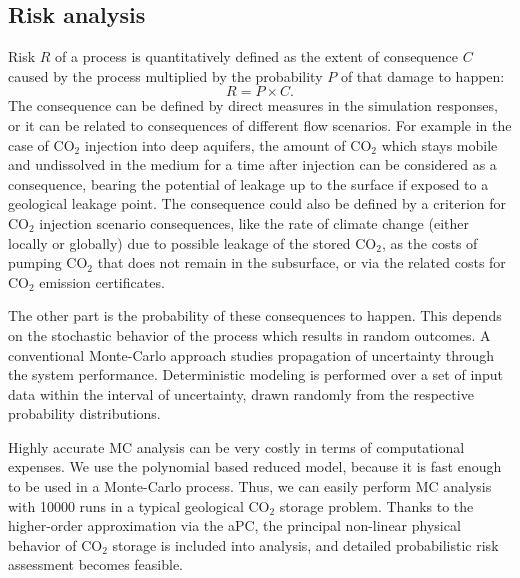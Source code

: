 \subsection{Risk analysis}
\label{Section:RA}
Risk $R$ of a process is quantitatively defined as the extent of consequence $C$ caused by the process multiplied by the probability $P$ of that damage to happen:
%
\begin{equation}
R=P\times C\label{eq:rsk}.\end{equation}
%
The consequence can be defined by direct measures in the simulation responses, or it can be related to consequences of different flow scenarios. For example in the case of $\mbox{CO}_{2}$ injection into deep aquifers, the amount of $\mbox{CO}_{2}$ which stays mobile and undissolved in the medium for a time after injection can be considered as a consequence, bearing the potential of leakage up to the surface if exposed to a geological leakage point. The consequence could also be defined by a criterion for $\mbox{CO}_{2}$ injection scenario consequences, like the rate of climate change (either locally or globally) due to possible leakage of the stored $\mbox{CO}_{2}$, as the costs of pumping $\mbox{CO}_{2}$ that does not remain in the subsurface, or via the related costs for $\mbox{CO}_{2}$ emission certificates.

The other part is the probability of these consequences to happen. This depends on the stochastic behavior of the process which results in random outcomes. A conventional Monte-Carlo approach studies propagation of uncertainty through the system performance. Deterministic modeling is performed over a set of input data within the interval of uncertainty, drawn randomly from the respective probability distributions. 

Highly accurate MC analysis can be very costly in terms of computational expenses. We use the polynomial based reduced model, because it is fast enough to be used in a Monte-Carlo process. Thus, we can easily perform MC analysis with 10000 runs in a typical geological $\mbox{CO}_{2}$ storage problem. Thanks to the higher-order approximation via the aPC, the principal non-linear physical behavior of  $\mbox{CO}_{2}$ storage is included into analysis, and detailed probabilistic risk assessment becomes feasible.

